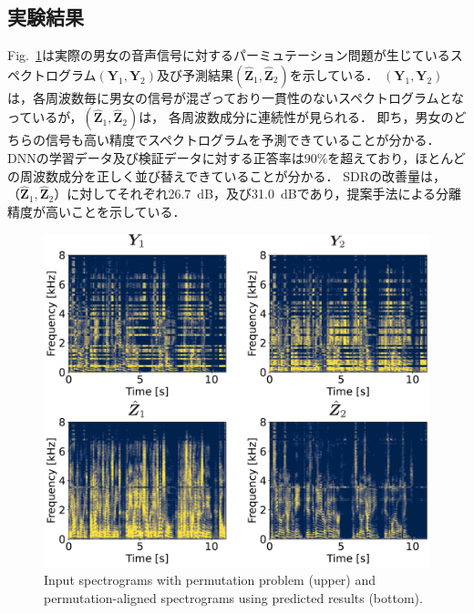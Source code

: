 \documentclass[a4j]{jsarticle}
\begin{document}
\subsection{実験結果}

Fig.~\ref{fig:audio_16block}は実際の男女の音声信号に対するパーミュテーション問題が生じているスペクトログラム$(\bm{Y}_1, \bm{Y}_2)$及び予測結果$(\hat{\bm{Z}}_1, \hat{\bm{Z}}_2)$を示している．
$(\bm{Y}_1, \bm{Y}_2)$は，各周波数毎に男女の信号が混ざっており一貫性のないスペクトログラムとなっているが，$(\hat{\bm{Z}}_1, \hat{\bm{Z}}_2)$は，
各周波数成分に連続性が見られる．
即ち，男女のどちらの信号も高い精度でスペクトログラムを予測できていることが分かる．
DNNの学習データ及び検証データに対する正答率は90\%を超えており，ほとんどの周波数成分を正しく並び替えできていることが分かる．
SDRの改善量は，$（\hat{\bm{Z}}_1,\hat{\bm{Z}}_2）$に対してそれぞれ26.7~dB，及び31.0~dBであり，提案手法による分離精度が高いことを示している．

\begin{figure}[t]
  \begin{center}
      \includegraphics[width=1.0\columnwidth]{figures/audio_16block.pdf}
  \end{center}
  \vspace{-15pt}
\caption{Input spectrograms with permutation problem (upper) and permutation-aligned spectrograms using predicted results (bottom).}
\label{fig:audio_16block}
\vspace{-15pt}
\end{figure}
\end{document}
